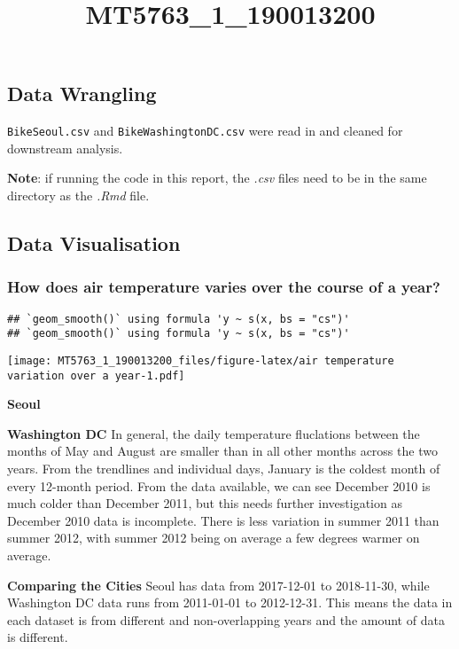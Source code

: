 \documentclass[]{article}
\title{MT5763\_1\_190013200}
\author{}
\date{}
\begin{document}
\maketitle

\hypertarget{data-wrangling}{%
\subsection{Data Wrangling}\label{data-wrangling}}

\texttt{BikeSeoul.csv} and \texttt{BikeWashingtonDC.csv} were read in
and cleaned for downstream analysis.

\textbf{Note}: if running the code in this report, the \emph{.csv} files
need to be in the same directory as the \emph{.Rmd} file.

\hypertarget{data-visualisation}{%
\subsection{Data Visualisation}\label{data-visualisation}}

\hypertarget{how-does-air-temperature-varies-over-the-course-of-a-year}{%
\subsubsection{How does air temperature varies over the course of a
year?}\label{how-does-air-temperature-varies-over-the-course-of-a-year}}

\begin{verbatim}
## `geom_smooth()` using formula 'y ~ s(x, bs = "cs")'
## `geom_smooth()` using formula 'y ~ s(x, bs = "cs")'
\end{verbatim}

\texttt{[image: MT5763\_1\_190013200\_files/figure-latex/air temperature variation over a year-1.pdf]}

\textbf{Seoul}

\textbf{Washington DC} In general, the daily temperature fluclations
between the months of May and August are smaller than in all other
months across the two years. From the trendlines and individual days,
January is the coldest month of every 12-month period. From the data
available, we can see December 2010 is much colder than December 2011,
but this needs further investigation as December 2010 data is
incomplete. There is less variation in summer 2011 than summer 2012,
with summer 2012 being on average a few degrees warmer on average.

\textbf{Comparing the Cities} Seoul has data from 2017-12-01 to
2018-11-30, while Washington DC data runs from 2011-01-01 to 2012-12-31.
This means the data in each dataset is from different and
non-overlapping years and the amount of data is different.
\end{document}
